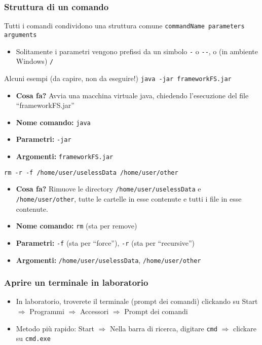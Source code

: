 \documentclass{beamer}
\begin{document}
\begin{frame}[fragile]
\frametitle{Struttura di un comando}
\begin{block}{Tutti i comandi condividono una struttura comune}
\texttt{commandName parameters arguments} 
\end{block}
\begin{itemize}
 \item Solitamente i parametri vengono prefissi da un simbolo \texttt{-} o \texttt{-{}-}, o (in ambiente Windows) \texttt{/}
\end{itemize}
\begin{block}{Alcuni esempi (da capire, non da eseguire!)}
\texttt{java -jar frameworkFS.jar} 
\scriptsize
\begin{itemize}
 \item \textbf{Cosa fa?} Avvia una macchina virtuale java, chiedendo l'esecuzione del file ``frameworkFS.jar''
 \item \textbf{Nome comando:} \texttt{java}
 \item \textbf{Parametri:} \texttt{-jar}
 \item \textbf{Argomenti:} \texttt{frameworkFS.jar}
\end{itemize}
\normalsize
\texttt{rm -r -f /home/user/uselessData /home/user/other} 
\scriptsize
\begin{itemize}
 \item \textbf{Cosa fa?} Rimuove le directory \texttt{/home/user/uselessData} e \texttt{/home/user/other}, tutte le cartelle in esse contenute e tutti i file in esse contenute.
 \item \textbf{Nome comando:} \texttt{rm} (sta per remove)
 \item \textbf{Parametri:} \texttt{-f} (sta per ``force''), \texttt{-r} (sta per ``recursive'')
 \item \textbf{Argomenti:} \texttt{/home/user/uselessData}, \texttt{/home/user/other}
\end{itemize}
\end{block}
\normalsize
\end{frame}

\begin{frame}[fragile]
\frametitle{Aprire un terminale in laboratorio}
\begin{itemize}
 \item In laboratorio, troverete il terminale (prompt dei comandi) clickando su Start $\Rightarrow$ Programmi $\Rightarrow$ Accessori $\Rightarrow$ Prompt dei comandi
 \item Metodo più rapido: Start  $\Rightarrow$ Nella barra di ricerca, digitare \texttt{cmd} $\Rightarrow$ clickare su \texttt{cmd.exe}
\end{itemize}
\end{frame}
\end{document}
